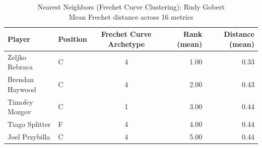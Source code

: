\begin{table}[t]
\caption*{
{\fontsize{20}{25} Nearest Neighbors (Frechet Curve Clustering): Rudy Gobert\fontsize{12}{15}\selectfont } \\ 
{\fontsize{14}{17}\selectfont  Mean Frechet distance across 16 metrics\fontsize{12}{15}\selectfont }
} 
\fontsize{12.0pt}{14.0pt}\selectfont
\begin{tabular*}{\linewidth}{@{\extracolsep{\fill}}llcrr}
\toprule
Player & Position & Frechet Curve Archetype & Rank (mean) & Distance (mean) \\ 
\midrule\addlinespace[2.5pt]
Zeljko Rebraca & C & 4 & 1.00 & 0.33 \\ 
Brendan Haywood & C & 4 & 2.00 & 0.43 \\ 
Timofey Mozgov & C & 1 & 3.00 & 0.44 \\ 
Tiago Splitter & F & 4 & 4.00 & 0.44 \\ 
Joel Przybilla & C & 4 & 5.00 & 0.44 \\ 
\bottomrule
\end{tabular*}
\end{table}

